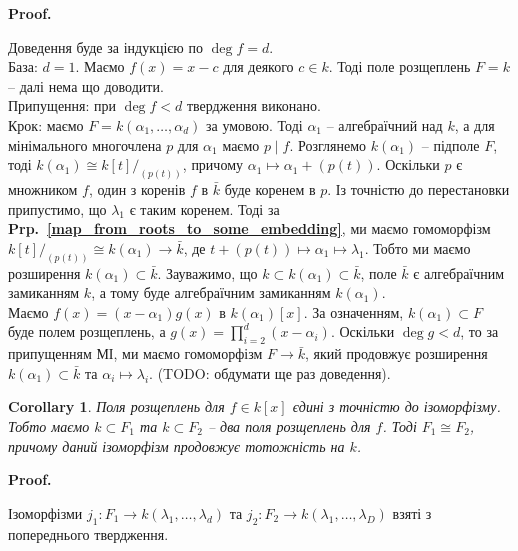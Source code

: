 \documentclass[a4paper, 10pt]{article}
\makeatletter
\theoremstyle{theoremdd}
\theoremstyle{theoremdd}
\theoremstyle{theoremdd}
\theoremstyle{theoremdd}
\theoremstyle{theoremdd}
\theoremstyle{theoremdd}
\theoremstyle{theoremdd}
\theoremstyle{theoremdd}
\theoremstyle{theoremdd}
\theoremstyle{theoremdd}
\theoremstyle{theoremdd}
\theoremstyle{theoremdd}
\theoremstyle{theoremdd}
\theoremstyle{theoremdd}
\newtheorem{corollary}[theorem]{Corollary}
\theoremstyle{theoremdd}
\renewenvironment{proof}[1][Proof.\\]{\par
\pushQED{\hfill \qed}%
\normalfont \topsep6\p@\@plus6\p@\relax
\trivlist
\item\relax
{\bfseries
#1\@addpunct{.}}\hspace\labelsep\ignorespaces
}{%
\popQED\endtrivlist\@endpefalse
}
\newcommand\prpref[1]{\textbf{Prp.~\ref{#1}}}
\makeatother
\begin{document}
\begin{proof}
Доведення буде за індукцією по $\deg f = d$.\\
База: $d = 1$. Маємо $f(x) = x - c$ для деякого $c \in k$. Тоді поле розщеплень $F = k$ -- далі нема що доводити.\\
Припущення: при $\deg f < d$ твердження виконано.\\
Крок: маємо $F = k(\alpha_1,\dots,\alpha_d)$ за умовою. Тоді $\alpha_1$ -- алгебраїчний над $k$, а для мінімального многочлена $p$ для $\alpha_1$ маємо $p \mid f$. Розглянемо $k(\alpha_1)$ -- підполе $F$, тоді $k(\alpha_1) \cong k[t]/_{(p(t))}$, причому $\alpha_1 \mapsto \alpha_1 + (p(t))$. Оскільки $p$ є множником $f$, один з коренів $f$ в $\bar{k}$ буде коренем в $p$. Із точністю до перестановки припустимо, що $\lambda_1$ є таким коренем. Тоді за \prpref{map_from_roots_to_some_embedding}, ми маємо гомоморфізм $k[t]/_{(p(t))} \cong k(\alpha_1) \to \bar{k}$, де $t + (p(t)) \mapsto \alpha_1 \mapsto \lambda_1$. Тобто ми маємо розширення $k(\alpha_1) \subset \bar{k}$. Зауважимо, що $k \subset k(\alpha_1) \subset \bar{k}$, поле $\bar{k}$ є алгебраїчним замиканням $k$, а тому буде алгебраїчним замиканням $k(\alpha_1)$.\\
Маємо $f(x) = (x-\alpha_1) g(x)$ в $k(\alpha_1)[x]$. За означенням, $k(\alpha_1) \subset F$ буде полем розщеплень, а $g(x) = \displaystyle\prod_{i=2}^d (x-\alpha_i)$. Оскільки $\deg g < d$, то за припущенням МІ, ми маємо гомоморфізм $F \to \bar{k}$, який продовжує розширення $k(\alpha_1) \subset \bar{k}$ та $\alpha_i \mapsto \lambda_i$. (TODO: обдумати ще раз доведення).
\end{proof}

\begin{corollary}
\label{splitting_fields_unique_up_to_isomorphism}
Поля розщеплень для $f \in k[x]$ єдині з точністю до ізоморфізму. Тобто маємо $k \subset F_1$ та $k \subset F_2$ -- два поля розщеплень для $f$. Тоді $F_1 \cong F_2$, причому даний ізоморфізм продовжує тотожність на $k$.
\end{corollary}


\begin{proof}
\begin{figure}[H]
\centering
{}
\end{figure}
Ізоморфізми $j_1 \colon F_1 \to k(\lambda_1,\dots,\lambda_d)$ та $j_2 \colon F_2 \to k(\lambda_1,\dots,\lambda_D)$ взяті з попереднього твердження.
\end{proof}
\end{document}
